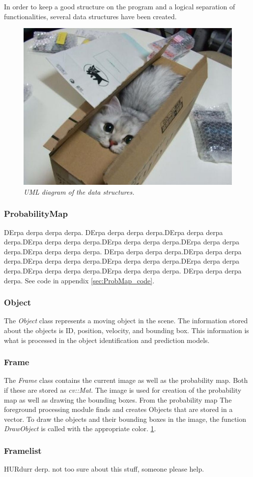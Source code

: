 In order to keep a good structure on the program and a logical separation of functionalities, several data structures have been created.

\begin{figure}[htb]
	\centering
	\includegraphics[width=\linewidth]{images/acatisfinetoo}
	\caption{\textit{UML diagram of the data structures.}}
	\label{fig:UML_fig} %
\end{figure}

\subsubsection{ProbabilityMap}
DErpa derpa derpa derpa. DErpa derpa derpa derpa.DErpa derpa derpa derpa.DErpa derpa derpa derpa.DErpa derpa derpa derpa.DErpa derpa derpa derpa.DErpa derpa derpa derpa.
DErpa derpa derpa derpa.DErpa derpa derpa derpa.DErpa derpa derpa derpa.DErpa derpa derpa derpa.DErpa derpa derpa derpa.DErpa derpa derpa derpa.DErpa derpa derpa derpa.
DErpa derpa derpa derpa. See code in appendix \ref{sec:ProbMap_code}. \cite{CVBook} %

\subsubsection{Object}
The \emph{Object} class represents a moving object in the scene. The information stored about the objects is ID, position, velocity, and bounding box. This information is what is processed in the object identification and prediction models. 

\subsubsection{Frame}
The \emph{Frame} class contains the current image as well as the probability map. Both if these are stored as \emph{cv::Mat}. The image is used for creation of the probability map as well as drawing the bounding boxes. From the probability map The foreground processing module finds and creates Objects that are stored in a vector. To draw the objects and their bounding boxes in the image, the function \emph{DrawObject} is called with the appropriate color. \ref{fig:UML_fig}. %

\subsubsection{Framelist}
HURdurr derp. not too sure about this stuff, someone please help.





